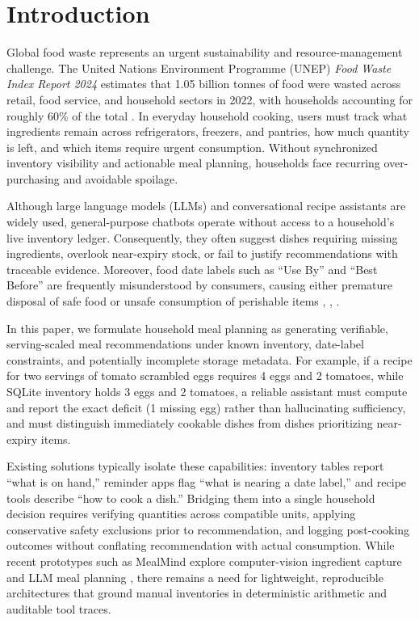 \section{Introduction}

Global food waste represents an urgent sustainability and resource-management challenge. The United Nations Environment Programme (UNEP) \textit{Food Waste Index Report 2024} estimates that 1.05 billion tonnes of food were wasted across retail, food service, and household sectors in 2022, with households accounting for roughly 60\% of the total \cite{ref1}. In everyday household cooking, users must track what ingredients remain across refrigerators, freezers, and pantries, how much quantity is left, and which items require urgent consumption. Without synchronized inventory visibility and actionable meal planning, households face recurring over-purchasing and avoidable spoilage.

Although large language models (LLMs) and conversational recipe assistants are widely used, general-purpose chatbots operate without access to a household's live inventory ledger. Consequently, they often suggest dishes requiring missing ingredients, overlook near-expiry stock, or fail to justify recommendations with traceable evidence. Moreover, food date labels such as ``Use By'' and ``Best Before'' are frequently misunderstood by consumers, causing either premature disposal of safe food or unsafe consumption of perishable items \cite{ref2}, \cite{ref8}, \cite{ref9}.

In this paper, we formulate household meal planning as generating verifiable, serving-scaled meal recommendations under known inventory, date-label constraints, and potentially incomplete storage metadata. For example, if a recipe for two servings of tomato scrambled eggs requires 4 eggs and 2 tomatoes, while SQLite inventory holds 3 eggs and 2 tomatoes, a reliable assistant must compute and report the exact deficit (1 missing egg) rather than hallucinating sufficiency, and must distinguish immediately cookable dishes from dishes prioritizing near-expiry items.

Existing solutions typically isolate these capabilities: inventory tables report ``what is on hand,'' reminder apps flag ``what is nearing a date label,'' and recipe tools describe ``how to cook a dish.'' Bridging them into a single household decision requires verifying quantities across compatible units, applying conservative safety exclusions prior to recommendation, and logging post-cooking outcomes without conflating recommendation with actual consumption. While recent prototypes such as MealMind explore computer-vision ingredient capture and LLM meal planning \cite{ref3}, there remains a need for lightweight, reproducible architectures that ground manual inventories in deterministic arithmetic and auditable tool traces.

